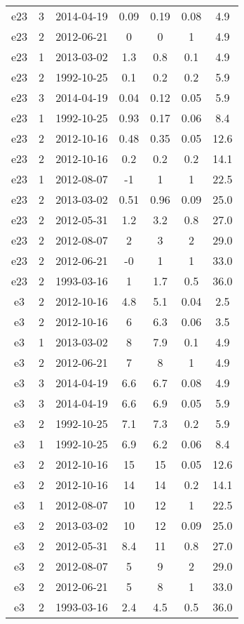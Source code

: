 \begin{table*}[htp]
\begin{tabular}{ccccccc}
e23 & 3 & 2014-04-19 & 0.09 & 0.19 & 0.08 & 4.9 \\
e23 & 2 & 2012-06-21 & 0 & 0 & 1 & 4.9 \\
e23 & 1 & 2013-03-02 & 1.3 & 0.8 & 0.1 & 4.9 \\
e23 & 2 & 1992-10-25 & 0.1 & 0.2 & 0.2 & 5.9 \\
e23 & 3 & 2014-04-19 & 0.04 & 0.12 & 0.05 & 5.9 \\
e23 & 1 & 1992-10-25 & 0.93 & 0.17 & 0.06 & 8.4 \\
e23 & 2 & 2012-10-16 & 0.48 & 0.35 & 0.05 & 12.6 \\
e23 & 2 & 2012-10-16 & 0.2 & 0.2 & 0.2 & 14.1 \\
e23 & 1 & 2012-08-07 & -1 & 1 & 1 & 22.5 \\
e23 & 2 & 2013-03-02 & 0.51 & 0.96 & 0.09 & 25.0 \\
e23 & 2 & 2012-05-31 & 1.2 & 3.2 & 0.8 & 27.0 \\
e23 & 2 & 2012-08-07 & 2 & 3 & 2 & 29.0 \\
e23 & 2 & 2012-06-21 & -0 & 1 & 1 & 33.0 \\
e23 & 2 & 1993-03-16 & 1 & 1.7 & 0.5 & 36.0 \\
e3 & 2 & 2012-10-16 & 4.8 & 5.1 & 0.04 & 2.5 \\
e3 & 2 & 2012-10-16 & 6 & 6.3 & 0.06 & 3.5 \\
e3 & 1 & 2013-03-02 & 8 & 7.9 & 0.1 & 4.9 \\
e3 & 2 & 2012-06-21 & 7 & 8 & 1 & 4.9 \\
e3 & 3 & 2014-04-19 & 6.6 & 6.7 & 0.08 & 4.9 \\
e3 & 3 & 2014-04-19 & 6.6 & 6.9 & 0.05 & 5.9 \\
e3 & 2 & 1992-10-25 & 7.1 & 7.3 & 0.2 & 5.9 \\
e3 & 1 & 1992-10-25 & 6.9 & 6.2 & 0.06 & 8.4 \\
e3 & 2 & 2012-10-16 & 15 & 15 & 0.05 & 12.6 \\
e3 & 2 & 2012-10-16 & 14 & 14 & 0.2 & 14.1 \\
e3 & 1 & 2012-08-07 & 10 & 12 & 1 & 22.5 \\
e3 & 2 & 2013-03-02 & 10 & 12 & 0.09 & 25.0 \\
e3 & 2 & 2012-05-31 & 8.4 & 11 & 0.8 & 27.0 \\
e3 & 2 & 2012-08-07 & 5 & 9 & 2 & 29.0 \\
e3 & 2 & 2012-06-21 & 5 & 8 & 1 & 33.0 \\
e3 & 2 & 1993-03-16 & 2.4 & 4.5 & 0.5 & 36.0 \\

\end{tabular}
\end{table*}
